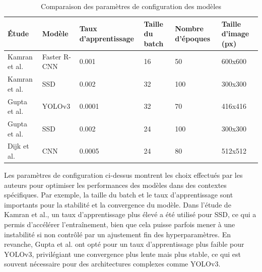 \begin{table}[H]
    \centering
    \begin{tabularx}{\textwidth}{|p{3cm}|p{2cm}|p{2cm}|p{2cm}|p{3cm}|p{2cm}|}
        \hline
        \textbf{Étude}                  & \textbf{Modèle} & \textbf{Taux d'apprentissage} & \textbf{Taille du batch} & \textbf{Nombre d'époques} & \textbf{Taille d'image (px)} \\ \hline
        Kamran et al. \cite{kamran2020} & Faster R-CNN    & 0.001                         & 16                       & 50                        & 600x600                      \\ \hline
        Kamran et al. \cite{kamran2020} & SSD             & 0.002                         & 32                       & 100                       & 300x300                      \\ \hline
        Gupta et al. \cite{gupta2021}   & YOLOv3          & 0.0001                        & 32                       & 70                        & 416x416                      \\ \hline
        Gupta et al. \cite{gupta2021}   & SSD             & 0.002                         & 24                       & 100                       & 300x300                      \\ \hline
        Dijk et al. \cite{spie2020}     & CNN             & 0.0005                        & 24                       & 80                        & 512x512                      \\ \hline
    \end{tabularx}
    \caption{Comparaison des paramètres de configuration des modèles}
    \label{tab:parametres}
\end{table}

Les paramètres de configuration ci-dessus montrent les choix effectués par les auteurs pour optimiser les performances des modèles dans des contextes spécifiques. Par exemple, la taille du batch et le taux d'apprentissage sont importants pour la stabilité et la convergence du modèle. Dans l'étude de Kamran et al., un taux d'apprentissage plus élevé a été utilisé pour SSD, ce qui a permis d'accélérer l'entraînement, bien que cela puisse parfois mener à une instabilité si non contrôlé par un ajustement fin des hyperparamètres. En revanche, Gupta et al. ont opté pour un taux d'apprentissage plus faible pour YOLOv3, privilégiant une convergence plus lente mais plus stable, ce qui est souvent nécessaire pour des architectures complexes comme YOLOv3.

